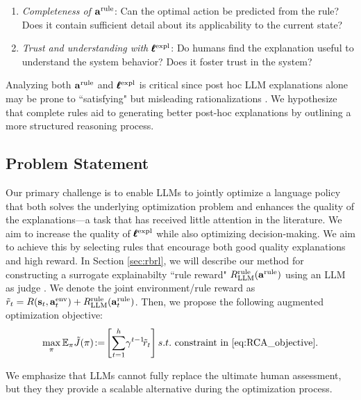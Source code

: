 \begin{enumerate}[leftmargin=2em,topsep=0pt,itemsep=0pt] \item \emph{Completeness of 
${\mathbf{a}}^{\text{rule}}$}: Can the optimal action be predicted from the rule? Does it contain sufficient detail about its applicability to the current state?
\item \emph{Trust and understanding with 
$\pmb{\ell}^{\text{expl}}$}: Do humans find the explanation useful to understand the system behavior? Does it foster trust in the system?
\end{enumerate}

Analyzing both ${\mathbf{a}}^{\text{rule}}$ and $\pmb{\ell}^{\text{expl}}$ is critical since post hoc LLM explanations alone may be prone to ``satisfying" but misleading rationalizations \citep{zhang2023understanding}. We hypothesize that complete rules aid to generating better post-hoc explanations by outlining a more structured reasoning process.

















\subsection{Problem Statement}



Our primary challenge is to enable LLMs to jointly optimize a language policy that both solves the underlying optimization problem and enhances the quality of the explanations---a task that has received little attention in the literature.  We aim to increase the quality of $\pmb{\ell}^{\text{expl}}$ while also optimizing decision-making. We aim to achieve this by selecting rules that encourage both good quality explanations and high reward.  In Section \ref{sec:rbrl}, we will describe our method for constructing a surrogate explainabilty ``rule reward" \(R^{\text{rule}}_{\textrm{LLM}}({\mathbf{a}}^{\text{rule}})\) using an LLM as judge  \citep{shen2024explainable, bhattacharjee2024towards, gu2024survey}. We denote the joint environment/rule reward as $ \tilde{r}_t = R({\mathbf{s}}_t, {\mathbf{a}}^{\text{env}}_t) + R^{\text{rule}}_{\textrm{LLM}}({\mathbf{a}}^{\text{rule}}_t)$.
Then, we propose the following augmented optimization objective:
\begin{align}\label{eq:RCA_objective_new}
    \max_\pi \mathbb{E}_\pi  \tilde{J}(\pi)\!:=\!\left[ \sum_{t=1}^h \!\gamma^{t-1}\! \tilde{r}_t \right] s.t. \text{ constraint~in} ~\eqref{eq:RCA_objective}.
\end{align}

We emphasize that LLMs cannot fully replace the ultimate human assessment, but they they provide a scalable alternative during the optimization process. 





